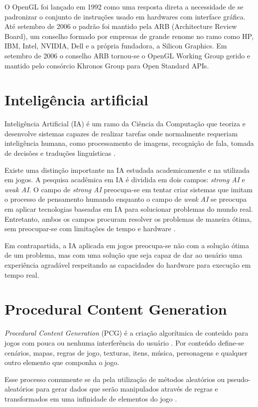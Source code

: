 \documentclass[12pt, 
openright, 
oneside, 
a4paper,    
brazil]{facom-ufu-abntex2}
\begin{document}
 O OpenGL foi lançado em 1992 como uma resposta direta a necessidade de se padronizar o conjunto de instruções usado em hardwares com interface gráfica. Até setembro de 2006 o padrão foi mantido pela ARB (Architecture Review Board), um conselho formado por empresas de grande renome no ramo como HP, IBM, Intel, NVIDIA, Dell e a própria fundadora, a Silicon Graphics. Em setembro de 2006 o conselho ARB tornou-se o OpenGL Working Group gerido e mantido pelo consórcio Khronos Group para Open Standard APIs\cite{OpenGLAbout}.
\section{Inteligência artificial}
Inteligência Artificial (IA) é um ramo da Ciência da Computação que teoriza e desenvolve sistemas capazes de realizar tarefas onde normalmente requeriam inteligência humana, como processamento de imagens, recognição de fala, tomada de decisões e traduções linguísticas \cite{AIDefinition}.

 Existe uma distinção importante na IA estudada academicamente e na utilizada em jogos. A pesquisa acadêmica em IA é dividida em dois campos: \textit{strong AI} e \textit{weak AI}. O campo de \textit{strong AI} preocupa-se em tentar criar sistemas que imitam o processo de pensamento humando enquanto o campo de \textit{weak AI} se preocupa em aplicar tecnologias baseadas em IA para solucionar problemas do mundo real. Entretanto, ambos os campos procuram resolver os problemas de maneira ótima, sem preocupar-se com limitações de tempo e hardware \cite{ProgrammingGameAIByExample}.

Em contrapartida, a IA aplicada em jogos preocupa-se não com a solução ótima de um problema, mas com uma solução que seja capaz de dar ao usuário uma experiência agradável respeitando as capacidades do hardware para execução em tempo real.
\section{Procedural Content Generation}
\textit{Procedural Content Generation} (PCG) é a criação algorítmica de conteúdo para jogos com pouca ou nenhuma interferência do usuário \cite{ProceduralContentGenerationInGames}. Por conteúdo define-se cenários, mapas, regras de jogo, texturas, itens, música, personagens e qualquer outro elemento que componha o jogo.

Esse processo comumente se da pela utilização de métodos aleatórios ou pseudo-aleatórios para gerar dados que serão manipulados através de regras e transformados em uma infinidade de elementos do jogo \cite{PCGWiki}.
\end{document}
